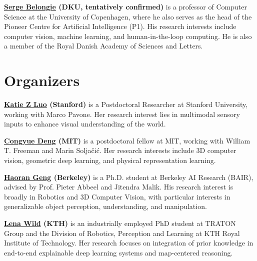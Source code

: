 \documentclass[runningheads]{llncs}
\begin{document}
\vspace{-0.5em}
\textbf{%
\href{https://serge.belongie.com/}
{\textcolor{emailblue}{Serge Belongie}} (DKU, tentatively confirmed)
}%
is a professor of Computer Science at the University of Copenhagen, where he also serves as the head of the Pioneer Centre for Artificial Intelligence (P1). His research interests include computer vision, machine learning, and human-in-the-loop computing. 
He is also a member of the Royal Danish Academy of Sciences and Letters.

\vspace{-1.25em}
\section{Organizers}

\vspace{-1.25em}
\textbf{%
\href{https://www.cs.cornell.edu/~katieluo/}
{\textcolor{emailblue}{Katie Z Luo}} (Stanford)
}%
is a Postdoctoral Researcher at Stanford University, working with Marco Pavone. Her research interest lies in multimodal sensory inputs to enhance visual understanding of the world. 

\vspace{-0.5em}

\textbf{%
\href{https://congyue-deng.github.io/}
{\textcolor{emailblue}{Congyue Deng}} (MIT)
}%
is a postdoctoral fellow at MIT, working with William T. Freeman and Marin Soljačić. Her research interests include 3D computer vision, geometric deep learning, and physical representation learning.

\vspace{-0.5em}
\textbf{%
\href{https://geng-haoran.github.io/}
{\textcolor{emailblue}{Haoran Geng}} (Berkeley)
}%
is a Ph.D. student at Berkeley AI Research (BAIR), advised by Prof. Pieter Abbeel and Jitendra Malik. His research interest is broadly in Robotics and 3D Computer Vision, with particular interests in generalizable object perception, understanding, and manipulation.

\vspace{-0.5em}
\textbf{%
\href{https://lwildd.github.io/}
{\textcolor{emailblue}{Lena Wild}} (KTH)
}%
is an industrially employed PhD student at TRATON Group and the Division of Robotics, Perception and Learning at KTH Royal Institute of Technology. Her research focuses on integration of prior knowledge in end-to-end explainable deep learning systems and map-centered reasoning.
\end{document}
